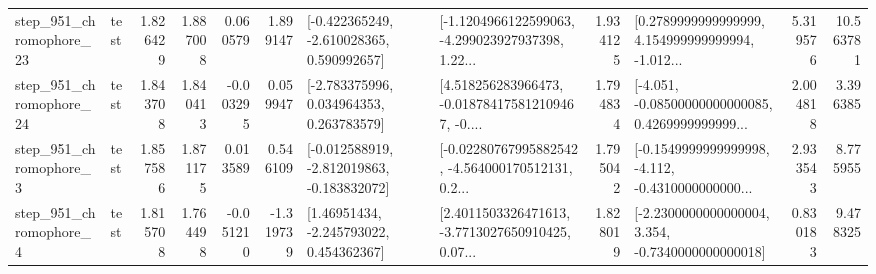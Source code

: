\begin{tabular}{llrrrrllrlrr}
  step\_951\_chromophore\_23 &      test &      1.826429 &    1.887008 &      0.060579 &  1.899147 &   [-0.422365249, -2.610028365, 0.590992657] &  [-1.1204966122599063, -4.299023927937398, 1.22... &       1.934125 &  [0.2789999999999999, 4.154999999999994, -1.012... &            5.319576 &         10.563781 \\
  step\_951\_chromophore\_24 &      test &      1.843708 &    1.840413 &     -0.003295 &  0.059947 &    [-2.783375996, 0.034964353, 0.263783579] &  [4.518256283966473, -0.018784175812109467, -0.... &       1.794834 &  [-4.051, -0.08500000000000085, 0.4269999999999... &            2.004818 &          3.396385 \\
   step\_951\_chromophore\_3 &      test &      1.857586 &    1.871175 &      0.013589 &  0.546109 &  [-0.012588919, -2.812019863, -0.183832072] &  [-0.02280767995882542, -4.564000170512131, 0.2... &       1.795042 &  [-0.1549999999999998, -4.112, -0.4310000000000... &            2.933543 &          8.775955 \\
   step\_951\_chromophore\_4 &      test &      1.815708 &    1.764498 &     -0.051210 & -1.319739 &     [1.46951434, -2.245793022, 0.454362367] &  [2.4011503326471613, -3.7713027650910425, 0.07... &       1.828019 &  [-2.2300000000000004, 3.354, -0.7340000000000018] &            0.830183 &          9.478325 \\
\bottomrule
\end{tabular}

